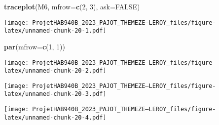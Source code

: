 \documentclass[
]{article}
\newenvironment{Shaded}{\begin{snugshade}}{\end{snugshade}}
\newcommand{\AttributeTok}[1]{\textcolor[rgb]{0.13,0.29,0.53}{#1}}
\newcommand{\CommentTok}[1]{\textcolor[rgb]{0.56,0.35,0.01}{\textit{#1}}}
\newcommand{\ConstantTok}[1]{\textcolor[rgb]{0.56,0.35,0.01}{#1}}
\newcommand{\DecValTok}[1]{\textcolor[rgb]{0.00,0.00,0.81}{#1}}
\newcommand{\FloatTok}[1]{\textcolor[rgb]{0.00,0.00,0.81}{#1}}
\newcommand{\FunctionTok}[1]{\textcolor[rgb]{0.13,0.29,0.53}{\textbf{#1}}}
\newcommand{\NormalTok}[1]{#1}
\newcommand{\OtherTok}[1]{\textcolor[rgb]{0.56,0.35,0.01}{#1}}
\newcommand{\SpecialCharTok}[1]{\textcolor[rgb]{0.81,0.36,0.00}{\textbf{#1}}}
\begin{document}
\begin{Shaded}
\begin{Highlighting}[]
\FunctionTok{traceplot}\NormalTok{(M6, }\AttributeTok{mfrow=}\FunctionTok{c}\NormalTok{(}\DecValTok{2}\NormalTok{, }\DecValTok{3}\NormalTok{), }\AttributeTok{ask=}\ConstantTok{FALSE}\NormalTok{)}
\end{Highlighting}
\end{Shaded}

\texttt{[image: ProjetHAB940B\_2023\_PAJOT\_THEMEZE--LEROY\_files/figure-latex/unnamed-chunk-20-1.pdf]}

\begin{Shaded}
\begin{Highlighting}[]
\FunctionTok{par}\NormalTok{(}\AttributeTok{mfrow=}\FunctionTok{c}\NormalTok{(}\DecValTok{1}\NormalTok{, }\DecValTok{1}\NormalTok{))}
\end{Highlighting}
\end{Shaded}

\texttt{[image: ProjetHAB940B\_2023\_PAJOT\_THEMEZE--LEROY\_files/figure-latex/unnamed-chunk-20-2.pdf]}

\begin{Shaded}
\end{Shaded}

\texttt{[image: ProjetHAB940B\_2023\_PAJOT\_THEMEZE--LEROY\_files/figure-latex/unnamed-chunk-20-3.pdf]}

\begin{Shaded}
\end{Shaded}

\texttt{[image: ProjetHAB940B\_2023\_PAJOT\_THEMEZE--LEROY\_files/figure-latex/unnamed-chunk-20-4.pdf]}

\begin{Shaded}
\end{Shaded}
\end{document}
